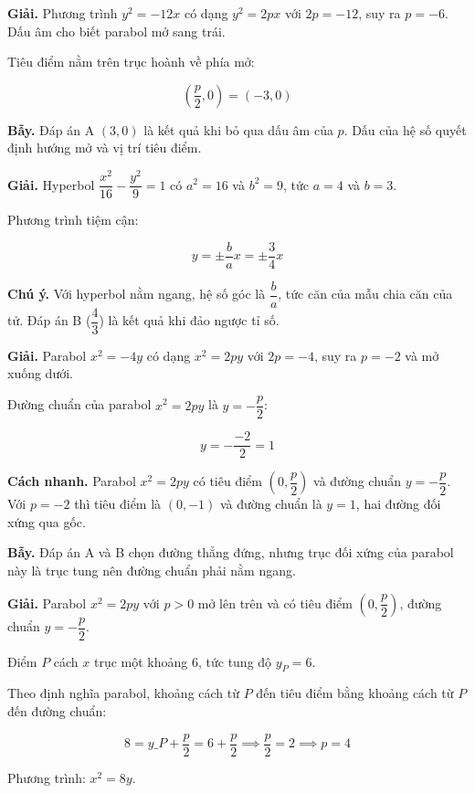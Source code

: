 \documentclass[11pt, a4paper]{article}
\begin{document}
\begin{dapan}[15 — Đáp án C]
\textbf{Giải.} Phương trình $y^2 = -12x$ có dạng $y^2 = 2px$ với $2p = -12$, suy ra $p = -6$. Dấu âm cho biết parabol mở sang trái.

Tiêu điểm nằm trên trục hoành về phía mở:

$$\left(\frac{p}{2}, 0\right) = (-3, 0)$$

\textbf{Bẫy.} Đáp án A $(3,0)$ là kết quả khi bỏ qua dấu âm của $p$. Dấu của hệ số quyết định hướng mở và vị trí tiêu điểm.
\end{dapan}

\begin{dapan}[16 — Đáp án A]
\textbf{Giải.} Hyperbol $\dfrac{x^2}{16} - \dfrac{y^2}{9} = 1$ có $a^2 = 16$ và $b^2 = 9$, tức $a = 4$ và $b = 3$.

Phương trình tiệm cận:

$$y = \pm\frac{b}{a}x = \pm\frac{3}{4}x$$

\textbf{Chú ý.} Với hyperbol nằm ngang, hệ số góc là $\dfrac{b}{a}$, tức căn của mẫu chia căn của tử. Đáp án B ($\dfrac{4}{3}$) là kết quả khi đảo ngược tỉ số.
\end{dapan}

\begin{dapan}[17 — Đáp án D]
\textbf{Giải.} Parabol $x^2 = -4y$ có dạng $x^2 = 2py$ với $2p = -4$, suy ra $p = -2$ và mở xuống dưới.

Đường chuẩn của parabol $x^2 = 2py$ là $y = -\dfrac{p}{2}$:

$$y = -\frac{-2}{2} = 1$$

\textbf{Cách nhanh.} Parabol $x^2 = 2py$ có tiêu điểm $\left(0, \dfrac{p}{2}\right)$ và đường chuẩn $y = -\dfrac{p}{2}$. Với $p = -2$ thì tiêu điểm là $(0,-1)$ và đường chuẩn là $y = 1$, hai đường đối xứng qua gốc.

\textbf{Bẫy.} Đáp án A và B chọn đường thẳng đứng, nhưng trục đối xứng của parabol này là trục tung nên đường chuẩn phải nằm ngang.
\end{dapan}

\begin{dapan}[18 — Đáp án C]
\textbf{Giải.} Parabol $x^2 = 2py$ với $p > 0$ mở lên trên và có tiêu điểm $\left(0, \dfrac{p}{2}\right)$, đường chuẩn $y = -\dfrac{p}{2}$.

Điểm $P$ cách $x$ trục một khoảng $6$, tức tung độ $y_P = 6$.

Theo định nghĩa parabol, khoảng cách từ $P$ đến tiêu điểm bằng khoảng cách từ $P$ đến đường chuẩn:

$$8 = y\_P + \frac{p}{2} = 6 + \frac{p}{2} \implies \frac{p}{2} = 2 \implies p = 4$$

Phương trình: $x^2 = 8y$.
\end{dapan}
\end{document}
